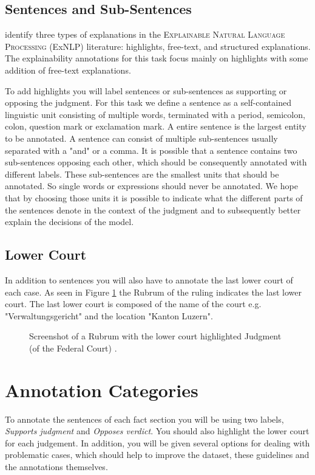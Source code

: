 \documentclass{article}
\begin{document}
\subsection{Sentences and Sub-Sentences}
\cite{TMTE_2021} identify three types of explanations in the \textsc{Explainable Natural Language Processing} (ExNLP) literature: highlights, free-text, and structured explanations. The explainability annotations for this task focus mainly on highlights with some addition of free-text explanations. 

To add highlights you will label sentences or sub-sentences as supporting or opposing the judgment. For this task we define a sentence as a self-contained linguistic unit consisting of multiple words, terminated with a period, semicolon, colon, question mark or exclamation mark. A entire sentence is the largest entity to be annotated. A sentence can consist of multiple sub-sentences usually separated with a "and" or a comma. It is possible that a sentence contains two sub-sentences opposing each other, which should be consequently annotated with different labels. These sub-sentences are the smallest units that should be annotated. So single words or expressions should never be annotated. We hope that by choosing those units it is possible to indicate what the different parts of the sentences denote in the context of the judgment and to subsequently better explain the decisions of the model.

\subsection{Lower Court}
In addition to sentences you will also have to annotate the last lower court of each case. As seen in Figure \ref{rubrum} the Rubrum of the ruling indicates the last lower court. The last lower court is composed of the name of the court e.g. "Verwaltungsgericht" and the location "Kanton Luzern".

\begin{figure}[H]
     \caption{Screenshot of a Rubrum with the lower court highlighted Judgment (of the Federal Court) \citeauthor{9C-424-2017}. }
     \label{rubrum}
\end{figure}

\section{Annotation Categories}
To annotate the sentences of each fact section you will be using two labels,  \emph{Supports judgment} and \emph{Opposes verdict}. You should also highlight the lower court for each judgement. In addition, you will be given several options for dealing with problematic cases, which should help to improve the dataset, these guidelines and the annotations themselves.
\end{document}
